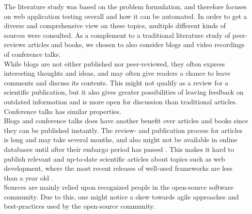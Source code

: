 
The literature study was based on the problem formulation, and therefore
focuses on web application testing overall and how it can be automated.
In order to get a diverse and comprehensive view on these topics,
multiple different kinds of sources were consulted. As a
complement to a traditional literature study of peer-reviews articles
and books, we chosen to also consider blogs and video recordings of
conference talks.\\

While blogs are not either published nor peer-reviewed, they often
express  interesting thoughts and ideas, and may often give readers a
chance to leave comments and discuss its contents. This might not
qualify as a review for a scientific publication, but it also gives
greater possibilities of leaving feedback on outdated information and
is more open for discussion than traditional articles. Conference
talks has similar properties.\\

Blogs and conference talks does have another benefit over articles and
books since they can be published instantly. The review- and publication
process for articles is long and may take several months, and also might
not be available in online databases until after their embargo period
has passed \cite{wiki:embargo, pdf:publishing}. This makes it hard to
publish relevant and up-to-date scientific articles about topics such as
web development, where the most recent releases of well-used frameworks
are less than a year old \cite{wiki:rails_versions,
wiki:django_versions, web:knockout_versions}.\\

Sources are mainly relied upon recognized people in the open-source
software community. Due to this, one might notice a skew towards agile
approaches and best-practices used by the open-source community.\\
